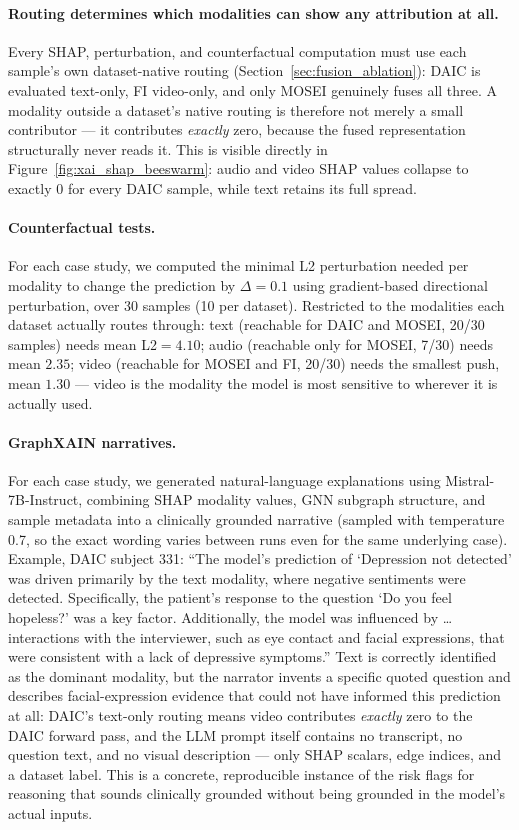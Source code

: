 \documentclass[12pt,oneside]{book}
\begin{document}
\paragraph{Routing determines which modalities can show any attribution at all.} Every SHAP, perturbation, and counterfactual computation must use each sample's own dataset-native routing (Section~\ref{sec:fusion_ablation}): DAIC is evaluated text-only, FI video-only, and only MOSEI genuinely fuses all three. A modality outside a dataset's native routing is therefore not merely a small contributor — it contributes \emph{exactly} zero, because the fused representation structurally never reads it. This is visible directly in Figure~\ref{fig:xai_shap_beeswarm}: audio and video SHAP values collapse to exactly 0 for every DAIC sample, while text retains its full spread.

\paragraph{Counterfactual tests.} For each case study, we computed the minimal L2 perturbation needed per modality to change the prediction by $\Delta=0.1$ using gradient-based directional perturbation, over 30 samples (10 per dataset). Restricted to the modalities each dataset actually routes through: text (reachable for DAIC and MOSEI, 20/30 samples) needs mean L2$=4.10$; audio (reachable only for MOSEI, 7/30) needs mean $2.35$; video (reachable for MOSEI and FI, 20/30) needs the smallest push, mean $1.30$ — video is the modality the model is most sensitive to wherever it is actually used.

\paragraph{GraphXAIN narratives.} For each case study, we generated natural-language explanations using Mistral-7B-Instruct, combining SHAP modality values, GNN subgraph structure, and sample metadata into a clinically grounded narrative (sampled with temperature 0.7, so the exact wording varies between runs even for the same underlying case). Example, DAIC subject 331: ``The model's prediction of `Depression not detected' was driven primarily by the text modality, where negative sentiments were detected. Specifically, the patient's response to the question `Do you feel hopeless?' was a key factor. Additionally, the model was influenced by \ldots interactions with the interviewer, such as eye contact and facial expressions, that were consistent with a lack of depressive symptoms.'' Text is correctly identified as the dominant modality, but the narrator invents a specific quoted question and describes facial-expression evidence that could not have informed this prediction at all: DAIC's text-only routing means video contributes \emph{exactly} zero to the DAIC forward pass, and the LLM prompt itself contains no transcript, no question text, and no visual description — only SHAP scalars, edge indices, and a dataset label. This is a concrete, reproducible instance of the risk \citep{wu2025cotfails} flags for reasoning that sounds clinically grounded without being grounded in the model's actual inputs.
\end{document}
